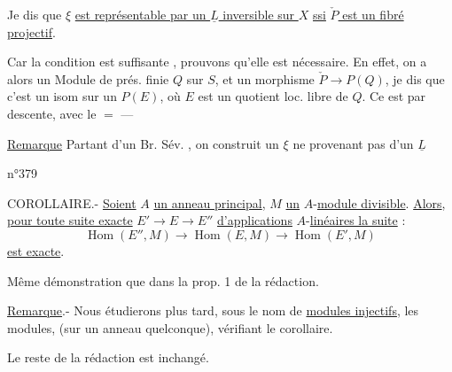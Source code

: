 Je dis que $\xi$ \uline{est représentable par un $\underline L$ inversible sur $X$} \uline{ssi} \uline{$\check P$ est un fibré projectif}.
\margin{[$f:X\to S$ propre, $f_*(O_X)=O_S$ \unsure{univ\textsuperscript{t}}]}

Car la condition est suffisante , prouvons qu'elle est nécessaire.  En effet, on a alors un Module de prés. finie $Q$ sur $S$, et un morphisme $\check P\longrightarrow P(Q)$, je dis que c'est un isom sur un $P(E)$, où $E$ est un quotient loc. libre de $Q$. Ce est par descente,  avec le $=$  ---



\uline{Remarque} Partant d'un Br. Sév. , on construit un $\xi$ ne provenant pas d'un $\underline L$  

\hfill n°379

COROLLAIRE.- \uline{Soient} $A$ \uline{un anneau principal}, $M$ \uline{un} $A$-\uline{module divisible}. \uline{Alors}, \uline{pour toute suite exacte} $E'\longrightarrow E\longrightarrow E''$ \uline{d'applications} $A$-\uline{linéaires la suite} :
\[
\operatorname{Hom}(E'',M)\longrightarrow\operatorname{Hom}(E,M)\longrightarrow\operatorname{Hom}(E',M)
\]
\uline{est exacte}.

Même démonstration que dans la prop. 1 de la rédaction.

\uline{Remarque}.- Nous étudierons plus tard, sous le nom de \uline{modules injectifs}, les modules, (sur un anneau quelconque), vérifiant le corollaire.

Le reste de la rédaction est inchangé.

\begin{center}\unsure{-:-:-:-}\end{center}

